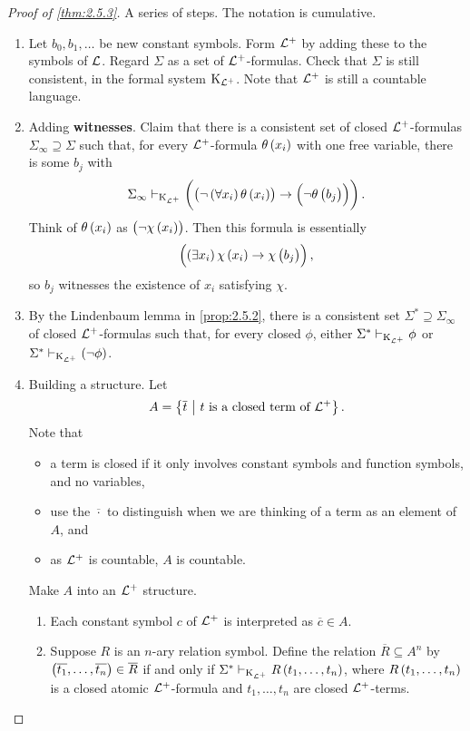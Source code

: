 \begin{proof}[Proof of \ref{thm:2.5.3}]
A series of steps. The notation is cumulative.
\begin{enumerate}[leftmargin=0.5in, label=Step \arabic*.]
\item Let $ b_0, b_1, \dots $ be new constant symbols. Form $ \mathcal{L}^+ $ by adding these to the symbols of $ \mathcal{L} $. Regard $ \Sigma $ as a set of $ \mathcal{L}^+ $-formulas. Check that $ \Sigma $ is still consistent, in the formal system $ \mathrm{K}_{\mathcal{L}^+} $. Note that $ \mathcal{L}^+ $ is still a countable language.
\item Adding \textbf{witnesses}. Claim that there is a consistent set of closed $ \mathcal{L}^+ $-formulas $ \Sigma_\infty \supseteq \Sigma $ such that, for every $ \mathcal{L}^+ $-formula $ \theta\br{x_i} $ with one free variable, there is some $ b_j $ with
$$ \Sigma_\infty \vdash_{\K_{\LLL^+}} \impb{\notb{\fab{x_i}\theta\br{x_i}}}{\notb{\theta\br{b_j}}}. $$
Think of $ \theta\br{x_i} $ as $ \notb{\chi\br{x_i}} $. Then this formula is essentially
$$ \impb{\teb{x_i}\chi\br{x_i}}{\chi\br{b_j}}, $$
so $ b_j $ witnesses the existence of $ x_i $ satisfying $ \chi $.
\item By the Lindenbaum lemma in \ref{prop:2.5.2}, there is a consistent set $ \Sigma^* \supseteq \Sigma_\infty $ of closed $ \mathcal{L}^+ $-formulas such that, for every closed $ \phi $, either $ \Sigma^* \vdash_{\mathrm{K}_{\mathcal{L}^+}} \phi $ or $ \Sigma^* \vdash_{\K_{\LLL^+}} \notb{\phi} $.
\item Building a structure. Let
$$ A = \cbr{\overline{t} \st t \ \text{is a closed term of} \ \LLL^+}. $$
Note that
\begin{itemize}
\item a term is closed if it only involves constant symbols and function symbols, and no variables,
\item use the $ \overline{\cdot} $ to distinguish when we are thinking of a term as an element of $ A $, and
\item as $ \mathcal{L}^+ $ is countable, $ A $ is countable.
\end{itemize}
Make $ A $ into an $ \mathcal{L}^+ $ structure.
\begin{enumerate}
\item Each constant symbol $ c $ of $ \mathcal{L}^+ $ is interpreted as $ \overline{c} \in A $.
\item Suppose $ R $ is an $ n $-ary relation symbol. Define the relation $ \overline{R} \subseteq A^n $ by $ \br{\overline{t_1}, \dots, \overline{t_n}} \in \overline{R} $ if and only if $ \Sigma^* \vdash_{\K_{\LLL^+}} R\br{t_1, \dots, t_n} $, where $ R\br{t_1, \dots, t_n} $ is a closed atomic $ \mathcal{L}^+ $-formula and $ t_1, \dots, t_n $ are closed $ \mathcal{L}^+ $-terms.

\end{enumerate}
\end{enumerate}
\end{proof}
